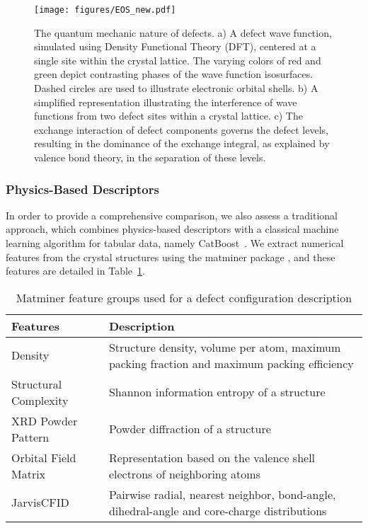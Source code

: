     \begin{figure}[h!]
        \centering
        \texttt{[image: figures/EOS\_new.pdf]}
        \caption{The quantum mechanic nature of defects. a) A defect wave function, simulated using Density Functional Theory (DFT), centered at a single  site within the  crystal lattice. The varying colors of red and green depict contrasting phases of the wave function isosurfaces. Dashed circles are used to illustrate electronic orbital shells.
    b) A simplified representation illustrating the interference of wave functions from two defect sites within a crystal lattice.
    c) The exchange interaction of defect components governs the defect levels, resulting in the dominance of the exchange integral, as explained by valence bond theory, in the separation of these levels.}
        \label{fig:EOS_new}
    \end{figure}
    
    
\subsubsection{Physics-Based Descriptors}
    \label{subsec:matminer-catboost}
    In order to provide a comprehensive comparison, we also assess a traditional approach, which combines physics-based descriptors with a classical machine learning algorithm for tabular data, namely CatBoost~\cite{prokhorenkova2018catboost}. We extract numerical features from the crystal structures using the matminer package \cite{6ddf244882c24092addcff4be1eb7ce1}, and these features are detailed in Table~\ref{tab:matminer}.
    
    \begin{table}[h!]
    \centering
    \begin{tabularx}{\textwidth}{@{}lX@{}}
     \toprule
     Features & Description \\ [0.5ex] 
     \midrule
     Density & Structure density, volume per atom, maximum packing fraction and maximum packing efficiency\\ 
     \midrule
     Structural Complexity~\cite{complexity2013} & Shannon information entropy of a structure \\  
     \midrule
     XRD Powder Pattern~\cite{Ong2013} & Powder diffraction of a structure \\ 
     \midrule
     Orbital Field Matrix~\cite{LamPham2017} & Representation based on the valence shell electrons of neighboring atoms \\
     \midrule
     JarvisCFID~\cite{PhysRevMaterials.2.083801} & Pairwise radial, nearest neighbor, bond-angle, dihedral-angle and core-charge distributions \\
     \bottomrule
    \end{tabularx}
    \caption{Matminer feature groups used for a defect configuration description}
    \label{tab:matminer}
    \end{table}
    

